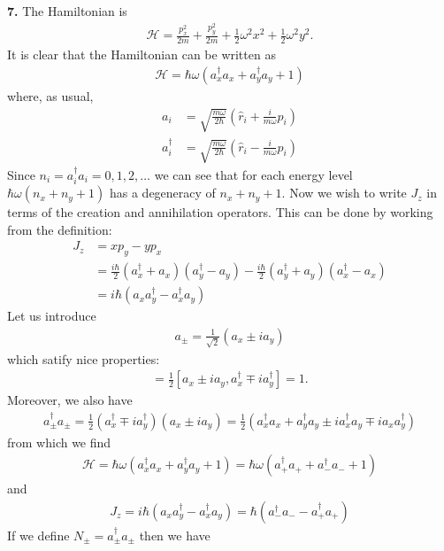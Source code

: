 \documentclass{article}
\theoremstyle{definition}
\newcommand{\ham}{\mathcal{H}}
\newcommand{\f}[2]{\frac{#1}{#2}}
\newcommand{\lp}{\left(}
\newcommand{\rp}{\right)}
\begin{document}
\noindent \textbf{7. } The Hamiltonian is 
\begin{align*}
\ham = \f{p_x^2}{2m} + \f{p_y^2}{2m} + \f{1}{2}\omega^2 x^2 + \f{1}{2}\omega^2 y^2.
\end{align*}
It is clear that the Hamiltonian can be written as
\begin{align*}
\ham = \hbar \omega \lp  a_x^\dagger a_x + a^\dagger_y a_y + 1 \rp
\end{align*}
where, as usual, 
\begin{align*}
a_i &= \sqrt{\f{m\omega}{2\hbar}}\lp \hat{r}_i + \f{i}{m\omega}\hat{p}_i \rp\\
a^\dagger_i &= \sqrt{\f{m\omega}{2\hbar}}\lp \hat{r}_i - \f{i}{m\omega} \hat{p}_i\rp
\end{align*}
Since $n_i = a^\dagger_i a_i = 0,1,2,\dots$ we can see that for each energy level $\hbar\omega(n_x+n_y+1)$ has a degeneracy of $n_x+n_y+1$. Now we wish to write $J_z$ in terms of the creation and annihilation operators. This can be done by working from the definition:
\begin{align*}
J_z 
&= xp_y - yp_x \\
&= \f{i\hbar}{2} (a_x^\dagger + a_x)(a^\dagger_y - a_y) - \f{i\hbar}{2}(a^\dagger_y + a_y)(a^\dagger_x - a_x) \\
&= i\hbar (a_xa^\dagger_y - a^\dagger_x a_y)
\end{align*}
Let us introduce
\begin{align*}
a_{\pm} = \f{1}{\sqrt{2}}(a_x \pm i a_y)
\end{align*}
which satify nice properties:
\begin{align*}
[a_\pm , a_\pm^\dagger] = \f{1}{2}[a_x \pm ia_y, a_x^\dagger \mp ia_y^\dagger] = 1 .
\end{align*}
Moreover, we also have
\begin{align*}
a^\dagger_\pm a_\pm = \f{1}{2}(a^\dagger_x \mp ia^\dagger_y)(a_x \pm ia_y) = \f{1}{2}(a^\dagger_x a_x + a^\dagger_y a_y \pm ia^\dagger_x a_y \mp ia_xa_y^\dagger)
\end{align*}
from which we find
\begin{align*}
\ham = \hbar\omega\lp a^\dagger_xa_x + a^\dagger_y a_y + 1 \rp = \hbar \omega( a^\dagger_+ a_+ + a^\dagger_- a_- +1)
\end{align*}
and 
\begin{align*}
J_z = i\hbar (a_xa^\dagger_y - a^\dagger_x a_y) =  \hbar (a^\dagger_- a_- - a^\dagger_+a_+)
\end{align*}
If we define $N_\pm  = a^\dagger_\pm a_\pm$ then we have
\end{document}
